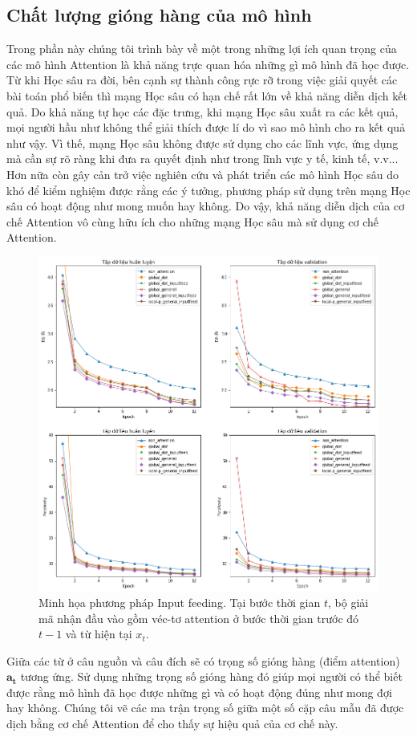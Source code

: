 \subsection{Chất lượng gióng hàng của mô hình}
Trong phần này chúng tôi trình bày về một trong những lợi ích quan trọng của các mô hình Attention là khả năng trực quan hóa những gì mô hình đã học được. Từ khi Học sâu ra đời, bên cạnh sự thành công rực rỡ trong việc giải quyết các bài toán phổ biến thì mạng Học sâu có hạn chế rất lớn về khả năng diễn dịch kết quả. Do khả năng tự học các đặc trưng, khi mạng Học sâu xuất ra các kết quả, mọi người hầu như không thể giải thích được lí do vì sao mô hình cho ra kết quả như vậy. Vì thế, mạng Học sâu không được sử dụng cho các lĩnh vực, ứng dụng mà cần sự rõ ràng khi đưa ra quyết định như trong lĩnh vực y tế, kinh tế, v.v... Hơn nữa còn gây cản trở việc nghiên cứu và phát triển các mô hình Học sâu do khó để kiểm nghiệm được rằng các ý tưởng, phương pháp sử dụng trên mạng Học sâu có hoạt động như mong muốn hay không. Do vậy, khả năng diễn dịch của cơ chế Attention vô cùng hữu ích cho những mạng Học sâu mà sử dụng cơ chế Attention.

\begin{figure}
	\centering
	\includegraphics[width=1.0\textwidth]{train_valid_xent_ppl.png}
	\caption[Minh họa cơ chế Attention Cục bộ.]{Minh họa phương pháp Input feeding. Tại bước thời gian $t$, bộ giải mã nhận đầu vào gồm véc-tơ attention ở bước thời gian trước đó $t-1$ và từ hiện tại $x_t$.}
	\label{fig_learning_curve}
\end{figure}

Giữa các từ ở câu nguồn và câu đích sẽ có trọng số gióng hàng (điểm attention) $\bm{a_t}$ tương ứng. Sử dụng những trọng số gióng hàng đó giúp mọi người có thể biết được rằng mô hình đã học được những gì và có hoạt động đúng như mong đợi hay không. Chúng tôi vẽ các ma trận trọng số giữa một số cặp câu mẫu đã được dịch bằng cơ chế Attention để cho thấy sự hiệu quả của cơ chế này.